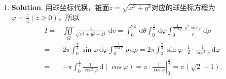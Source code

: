 \documentclass[../Main.tex]{subfiles}
\begin{document}
\begin{enumerate}
    \item \textbf{Solution}. 用球坐标代换，锥面$z=\sqrt{x^{2}+y^{2}}$对应的球坐标方程为$\varphi
              = \frac{\pi}{4}(z\geq 0)$，所以
          \[
              \begin{aligned}
                  I = & \iiint\limits_{\Omega}\frac{1}{\sqrt{x^2+y^2+z^2}}\,\mathrm{d}v = \int_{0}^{2\pi}\,\mathrm{d}\theta\int_{0}^{\frac{\pi}{4}}\,\mathrm{d}\varphi\int_{0}^{\frac{1}{\cos \varphi}}\frac{\rho^{2}\sin \varphi}{\rho}\,\mathrm{d}\rho \\
                  =   & 2\pi\int_{0}^{\frac{\pi}{4}}\sin \varphi\,\mathrm{d}\varphi\int_{0}^{\frac{1}{\cos \varphi}}\rho\,\mathrm{d}\rho = 2\pi\int_{0}^{\frac{\pi}{4}}\sin \varphi \cdot \frac{1}{2}\cdot \frac{1}{\cos^{2} \varphi}\,\mathrm{d}\varphi \\
                  =   & -\pi\int_{0}^{\frac{\pi}{4}}\frac{1}{\cos^2 \varphi}\,\mathrm{d}(\cos \varphi) = \left.\pi\cdot \frac{1}{\cos \varphi}\right|_{0}^{\frac{\pi}{4}}= \pi\left(\sqrt{2}-1\right).
              \end{aligned}
          \]
\end{enumerate}
\end{document}
